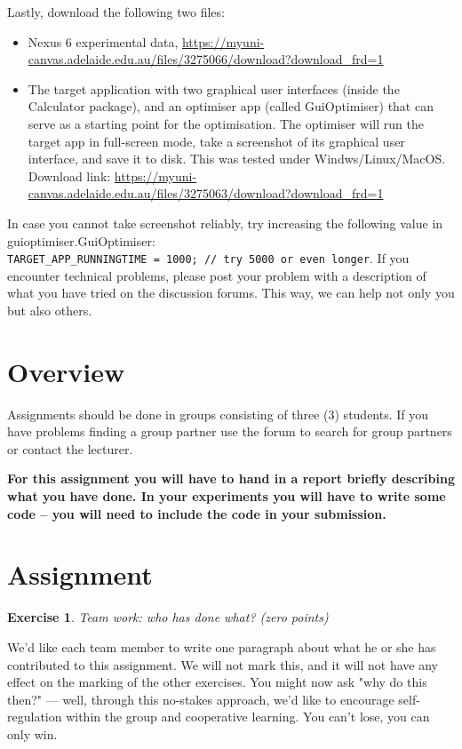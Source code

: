 \documentclass{pracs}
\newtheorem{exercise}{Exercise}
\begin{document}
Lastly, download the following two files:

\begin{itemize}
\item Nexus 6 experimental data, \url{https://myuni-canvas.adelaide.edu.au/files/3275066/download?download_frd=1}
\item The target application with two graphical user interfaces (inside the Calculator package), and  an optimiser app (called GuiOptimiser) that can serve as a starting point for the optimisation. The optimiser will run the target app in full-screen mode, take a screenshot of its graphical user interface, and save it to disk. This was tested under Windws/Linux/MacOS. Download link: \url{https://myuni-canvas.adelaide.edu.au/files/3275063/download?download_frd=1}
\end{itemize}

In case you cannot take screenshot reliably, try increasing the following value in guioptimiser.GuiOptimiser: \\\texttt{TARGET\_APP\_RUNNINGTIME = 1000; // try 5000 or even longer}.
If you encounter technical problems, please post your problem with a description of what you have tried on the discussion forums. This way, we can help not only you but also others.





\section{Overview}
Assignments should be done in groups consisting of three (3) students.  If you have problems finding a group partner use the forum to search for group partners or contact the lecturer.

\textbf{For this assignment you will have to hand in a report briefly describing what you have done. In your experiments you will have to write some code -- you will need to include the code in your submission.}

\section{Assignment}

\begin{exercise}
Team work: who has done what? (zero points)
\end{exercise}

We'd like each team member to write one paragraph about what he or she has contributed to this assignment. We will not mark this, and it will not have any effect on the marking of the other exercises. You might now ask "why do this then?" --- well, through this no-stakes approach, we'd like to encourage self-regulation within the group and cooperative learning. You can't lose, you can only win.
\end{document}

